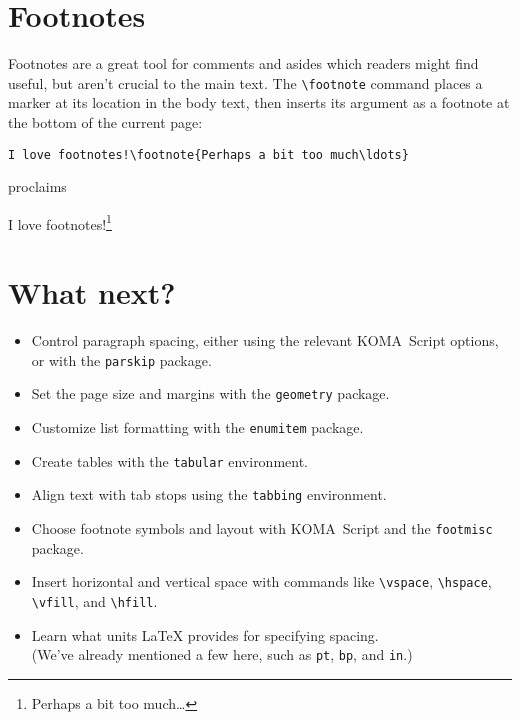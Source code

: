 \section{Footnotes}

Footnotes are a great tool for comments and asides which readers might
find useful, but aren't crucial to the main text.
The \verb|\footnote| command places a marker at its location in the
body text, then inserts its argument as a footnote at the bottom of the current
page:
\begin{leftfigure}
\begin{lstlisting}
I love footnotes!\footnote{Perhaps a bit too much\ldots}
\end{lstlisting}
\end{leftfigure}
proclaims
\begin{leftfigure}
\lm%
I love footnotes!\footnote{Perhaps a bit too much\ldots}
\end{leftfigure}

\section{What next?}
\begin{itemize}
\item Control paragraph spacing, either using the relevant
KOMA~Script options, or with the \texttt{parskip} package.
\item Set the page size and margins with the \texttt{geometry} package.
\item Customize list formatting with the \texttt{enumitem} package.
\item Create tables with the \texttt{tabular} environment.
\item Align text with tab stops using the \texttt{tabbing} environment.
\item Choose footnote symbols and layout with KOMA~Script and the
    \texttt{footmisc} package.
\item Insert horizontal and vertical space with commands like
    \verb|\vspace|, \verb|\hspace|, \verb|\vfill|, and \verb|\hfill|.
\item Learn what units \LaTeX{} provides for specifying spacing. \\
    (We've already mentioned a few here, such as
    \texttt{pt}, \texttt{bp}, and \texttt{in}.)
\end{itemize}
